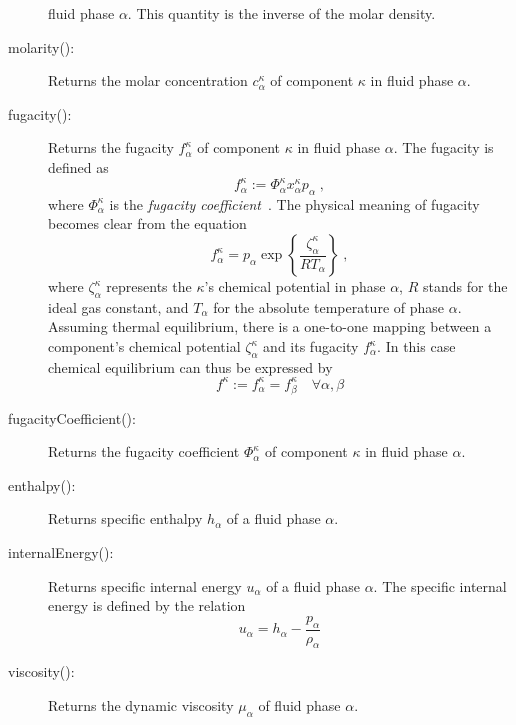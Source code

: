 \begin{description}
  fluid phase $\alpha$. This quantity is the inverse of the molar
  density.
\item[molarity():] Returns the molar concentration $c^\kappa_\alpha$
  of component $\kappa$ in fluid phase $\alpha$.
\item[fugacity():] Returns the fugacity $f^\kappa_\alpha$ of component
  $\kappa$ in fluid phase $\alpha$. The fugacity is defined as
  \[
  f_\alpha^\kappa := \Phi^\kappa_\alpha x^\kappa_\alpha p_\alpha \;,
  \]
  where $\Phi^\kappa_\alpha$ is the {\em fugacity
    coefficient}~\cite{reid1987}.  The physical meaning of fugacity
  becomes clear from the equation
  \[
  f_\alpha^\kappa = p_\alpha \exp\left\{\frac{\zeta^\kappa_\alpha}{R T_\alpha} \right\} \;,
  \]
  where $\zeta^\kappa_\alpha$ represents the $\kappa$'s chemical
  potential in phase $\alpha$, $R$ stands for the ideal gas constant,
  and $T_\alpha$ for the absolute temperature of phase
  $\alpha$. Assuming thermal equilibrium, there is a one-to-one
  mapping between a component's chemical potential
  $\zeta^\kappa_\alpha$ and its fugacity $f^\kappa_\alpha$. In this
  case chemical equilibrium can thus be expressed by
  \[
  f^\kappa := f^\kappa_\alpha = f^\kappa_\beta\quad\forall \alpha, \beta
  \]
\item[fugacityCoefficient():] Returns the fugacity coefficient
  $\Phi^\kappa_\alpha$ of component $\kappa$ in fluid phase $\alpha$.
\item[enthalpy():] Returns specific enthalpy $h_\alpha$ of a fluid
  phase $\alpha$.
\item[internalEnergy():] Returns specific internal energy $u_\alpha$
  of a fluid phase $\alpha$. The specific internal energy is defined
  by the relation
  \[
  u_\alpha = h_\alpha - \frac{p_\alpha}{\rho_\alpha}
  \]
\item[viscosity():] Returns the dynamic viscosity
  $\mu_\alpha$ of fluid phase $\alpha$.
\end{description}

